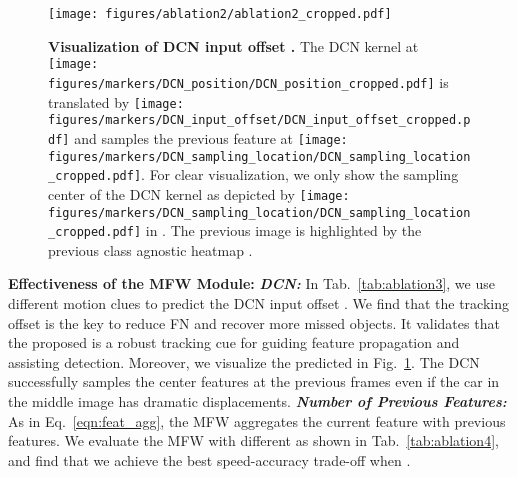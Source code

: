 \documentclass[final]{cvpr}
\newcommand{\myparagraph}[1]{{\vspace{0.5em} \noindent \bf #1}}
\begin{document}
\begin{figure}
	\centering
	\vspace{-3mm}
	\texttt{[image: figures/ablation2/ablation2\_cropped.pdf]}
	\caption{\textbf{Visualization of DCN input offset .} The DCN kernel at \protect\texttt{[image: figures/markers/DCN\_position/DCN\_position\_cropped.pdf]} is translated by \protect\texttt{[image: figures/markers/DCN\_input\_offset/DCN\_input\_offset\_cropped.pdf]} and samples the previous feature at \protect\texttt{[image: figures/markers/DCN\_sampling\_location/DCN\_sampling\_location\_cropped.pdf]}. For clear visualization, we only show the sampling center of the DCN kernel as depicted by \protect\texttt{[image: figures/markers/DCN\_sampling\_location/DCN\_sampling\_location\_cropped.pdf]} in . The previous image is highlighted by the previous class agnostic heatmap .}
	\label{fig:ablation2}
	\vspace{-2mm}
\end{figure}

\myparagraph{Effectiveness of the MFW Module:} \textbf{\emph{DCN:}} In Tab.~\ref{tab:ablation3}, we use different motion clues to predict the DCN input offset . We find that the tracking offset  is the key to reduce FN and recover more missed objects. It validates that the proposed  is a robust tracking cue for guiding feature propagation and assisting detection. Moreover, we visualize the predicted  in Fig.~\ref{fig:ablation2}. The DCN successfully samples the center features at the previous frames even if the car in the middle image has dramatic displacements. \textbf{\emph{Number of Previous Features:}} As in Eq.~\ref{eqn:feat_agg}, the MFW aggregates the current feature with  previous features. We evaluate the MFW with different  as shown in Tab.~\ref{tab:ablation4}, and find that we achieve the best speed-accuracy trade-off when .
\end{document}
